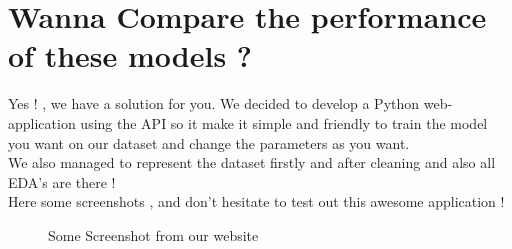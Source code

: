 \documentclass{article}
\begin{document}
\section{Wanna Compare the performance of these models ?}
Yes ! , we have a solution for you. We decided to develop a Python web-application using the  API so it make it simple and friendly to train the model you want on our dataset and change the parameters as you want.\\
We also managed to represent the dataset firstly and after cleaning and also all EDA's are there ! \\
Here some screenshots , and don't hesitate to test out this awesome application !
\begin{figure}[H]
    \centering
    \qquad
    \caption{Some Screenshot from our website}
    \label{fig:example}
\end{figure}
\end{document}
